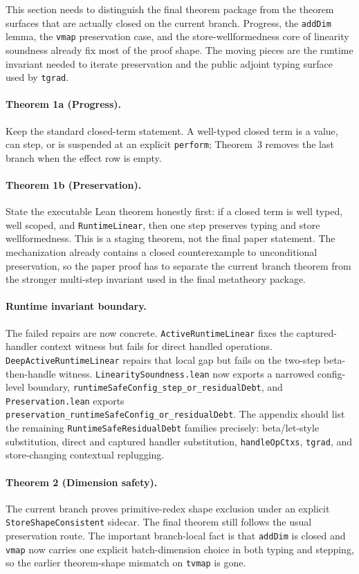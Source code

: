 This section needs to distinguish the final theorem package from the theorem surfaces that are actually closed on the current branch. Progress, the \texttt{addDim} lemma, the \texttt{vmap} preservation case, and the store-wellformedness core of linearity soundness already fix most of the proof shape. The moving pieces are the runtime invariant needed to iterate preservation and the public adjoint typing surface used by \texttt{tgrad}.

\paragraph{Theorem 1a (Progress).}
Keep the standard closed-term statement. A well-typed closed term is a value, can step, or is suspended at an explicit \texttt{perform}; Theorem~3 removes the last branch when the effect row is empty.

\paragraph{Theorem 1b (Preservation).}
State the executable Lean theorem honestly first: if a closed term is well typed, well scoped, and \texttt{RuntimeLinear}, then one step preserves typing and store wellformedness. This is a staging theorem, not the final paper statement. The mechanization already contains a closed counterexample to unconditional preservation, so the paper proof has to separate the current branch theorem from the stronger multi-step invariant used in the final metatheory package.

\paragraph{Runtime invariant boundary.}
The failed repairs are now concrete. \texttt{ActiveRuntimeLinear} fixes the captured-handler context witness but fails for direct handled operations. \texttt{DeepActiveRuntimeLinear} repairs that local gap but fails on the two-step beta-then-handle witness. \texttt{LinearitySoundness.lean} now exports a narrowed config-level boundary, \texttt{runtimeSafeConfig\_step\_or\_residualDebt}, and \texttt{Preservation.lean} exports \texttt{preservation\_runtimeSafeConfig\_or\_residualDebt}. The appendix should list the remaining \texttt{RuntimeSafeResidualDebt} families precisely: beta/let-style substitution, direct and captured handler substitution, \texttt{handleOpCtxs}, \texttt{tgrad}, and store-changing contextual replugging.

\paragraph{Theorem 2 (Dimension safety).}
The current branch proves primitive-redex shape exclusion under an explicit \texttt{StoreShapeConsistent} sidecar. The final theorem still follows the usual preservation route. The important branch-local fact is that \texttt{addDim} is closed and \texttt{vmap} now carries one explicit batch-dimension choice in both typing and stepping, so the earlier theorem-shape mismatch on \texttt{tvmap} is gone.

